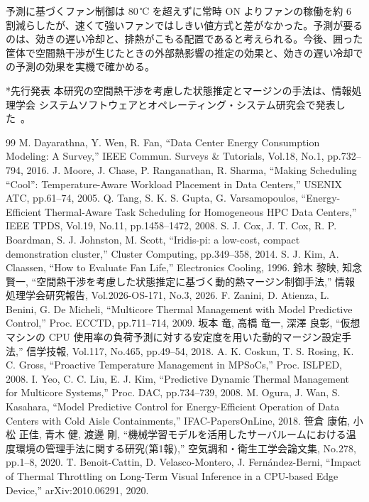 \documentclass[10pt,uplatex,dvipdfmx,twocolumn]{jsarticle}
\makeatletter
\renewcommand{\section}{\@startsection{section}{1}{\z@}{0.6\Cvs \@plus.3\Cdp}{0.3\Cvs}{\normalfont\large\headfont\raggedright}}
\makeatother
\begin{document}
\section{おわりに}
予測に基づくファン制御は 80\,℃ を超えずに常時 ON よりファンの稼働を約 6 割減らしたが、速くて強いファンではしきい値方式と差がなかった。予測が要るのは、効きの遅い冷却と、排熱がこもる配置であると考えられる。今後、囲った筐体で空間熱干渉が生じたときの外部熱影響の推定の効果と、効きの遅い冷却での予測の効果を実機で確かめる。

\section*{先行発表}
本研究の空間熱干渉を考慮した状態推定とマージンの手法は、情報処理学会 システムソフトウェアとオペレーティング・システム研究会で発表した~\cite{ipsj}。

\footnotesize{
\begin{thebibliography}{99}
  \setlength{\itemsep}{0pt}
   M. Dayarathna, Y. Wen, R. Fan, ``Data Center Energy Consumption Modeling: A Survey,'' IEEE Commun. Surveys \& Tutorials, Vol.18, No.1, pp.732--794, 2016.
   J. Moore, J. Chase, P. Ranganathan, R. Sharma, ``Making Scheduling ``Cool'': Temperature-Aware Workload Placement in Data Centers,'' USENIX ATC, pp.61--74, 2005.
   Q. Tang, S. K. S. Gupta, G. Varsamopoulos, ``Energy-Efficient Thermal-Aware Task Scheduling for Homogeneous HPC Data Centers,'' IEEE TPDS, Vol.19, No.11, pp.1458--1472, 2008.
   S. J. Cox, J. T. Cox, R. P. Boardman, S. J. Johnston, M. Scott, ``Iridis-pi: a low-cost, compact demonstration cluster,'' Cluster Computing, pp.349--358, 2014.
   S. J. Kim, A. Claassen, ``How to Evaluate Fan Life,'' Electronics Cooling, 1996.
   鈴木 黎映, 知念 賢一, ``空間熱干渉を考慮した状態推定に基づく動的熱マージン制御手法,'' 情報処理学会研究報告, Vol.2026-OS-171, No.3, 2026.
   F. Zanini, D. Atienza, L. Benini, G. De Micheli, ``Multicore Thermal Management with Model Predictive Control,'' Proc. ECCTD, pp.711--714, 2009.
   坂本 竜, 高橋 竜一, 深澤 良彰, ``仮想マシンの CPU 使用率の負荷予測に対する安定度を用いた動的マージン設定手法,'' 信学技報, Vol.117, No.465, pp.49--54, 2018.
   A. K. Coskun, T. S. Rosing, K. C. Gross, ``Proactive Temperature Management in MPSoCs,'' Proc. ISLPED, 2008.
   I. Yeo, C. C. Liu, E. J. Kim, ``Predictive Dynamic Thermal Management for Multicore Systems,'' Proc. DAC, pp.734--739, 2008.
   M. Ogura, J. Wan, S. Kasahara, ``Model Predictive Control for Energy-Efficient Operation of Data Centers with Cold Aisle Containments,'' IFAC-PapersOnLine, 2018.
   笹倉 康佑, 小松 正佳, 青木 健, 渡邊 剛, ``機械学習モデルを活用したサーバルームにおける温度環境の管理手法に関する研究(第1報),'' 空気調和・衛生工学会論文集, No.278, pp.1--8, 2020.
   T. Benoit-Cattin, D. Velasco-Montero, J. Fern\'{a}ndez-Berni, ``Impact of Thermal Throttling on Long-Term Visual Inference in a CPU-based Edge Device,'' arXiv:2010.06291, 2020.
\end{thebibliography}
}
\end{document}
